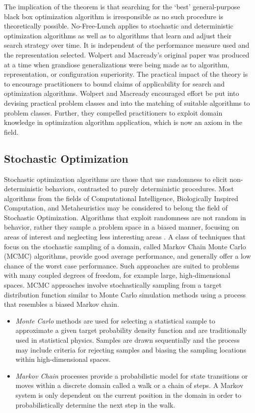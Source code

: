 \begin{bibunit}
The implication of the theorem is that searching for the `best' general-purpose black box optimization algorithm is irresponsible as no such procedure is theoretically possible. No-Free-Lunch applies to stochastic and deterministic optimization algorithms as well as to algorithms that learn and adjust their search strategy over time. It is independent of the performance measure used and the representation selected. 
Wolpert and Macready's original paper was produced at a time when grandiose generalizations were being made as to algorithm, representation, or configuration superiority. The practical impact of the theory is to encourage practitioners to bound claims of applicability for search and optimization algorithms. Wolpert and Macready encouraged effort be put into devising practical problem classes and into the matching of suitable algorithms to problem classes. Further, they compelled practitioners to exploit domain knowledge in optimization algorithm application, which is now an axiom in the field.

% 
% 
\subsection{Stochastic Optimization}
\label{subsec:stochastic}
Stochastic optimization algorithms are those that use randomness to elicit non-deterministic behaviors, contrasted to purely deterministic procedures. 
Most algorithms from the fields of Computational Intelligence, Biologically Inspired Computation, and Metaheuristics may be considered to belong the field of Stochastic Optimization. Algorithms that exploit randomness are not random in behavior, rather they sample a problem space in a biased manner, focusing on areas of interest and neglecting less interesting areas \cite{Spall2003}. 
A class of techniques that focus on the stochastic sampling of a domain, called Markov Chain Monte Carlo (MCMC) algorithms, provide good average performance, and generally offer a low chance of the worst case performance. Such approaches are suited to problems with many coupled degrees of freedom, for example large, high-dimensional spaces. MCMC approaches involve stochastically sampling from a target distribution function similar to Monte Carlo simulation methods using a process that resembles a biased Markov chain.

\begin{itemize}
	\item \emph{Monte Carlo} methods are used for selecting a statistical sample to approximate a given target probability density function and are traditionally used in statistical physics. Samples are drawn sequentially and the process may include criteria for rejecting samples and biasing the sampling locations within high-dimensional spaces. 
	\item \emph{Markov Chain} processes provide a probabilistic model for state transitions or moves within a discrete domain called a walk or a chain of steps. A Markov system is only dependent on the current position in the domain in order to probabilistically determine the next step in the walk.
\end{itemize}


\end{bibunit}
